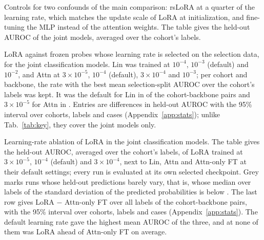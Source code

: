 \begin{table}[H]
\centering
\caption{Controls for two confounds of the main comparison: rsLoRA at a quarter of the learning rate, which matches the update scale of LoRA at initialization, and fine-tuning the MLP instead of the attention weights. The table gives the held-out AUROC of the joint models, averaged over the cohort's labels.}
\label{tab:controls}
\end{table}

\begin{table}[H]
\centering
\caption{LoRA against frozen probes whose learning rate is selected on the selection data, for the joint classification models. Lin was trained at $10^{-4}$, $10^{-3}$ (default) and $10^{-2}$, and Attn at $3\times10^{-5}$, $10^{-4}$ (default), $3\times10^{-4}$ and $10^{-3}$; per cohort and backbone, the rate with the best mean selection-split AUROC over the cohort's labels was kept. It was the default for Lin in \numProbelrLinKeptN{} of the \numProbelrPairsN{} cohort-backbone pairs and $3\times10^{-5}$ for Attn in \numProbelrAttnLowN{}. Entries are differences in held-out AUROC with the 95\% interval over cohorts, labels and cases (Appendix~\ref{app:stats}); unlike Tab.~\ref{tab:key}, they cover the joint models only.}
\label{tab:probelr}
\end{table}

\begin{table}[H]
\centering
\caption{Learning-rate ablation of LoRA in the joint classification models. The table gives the held-out AUROC, averaged over the cohort's labels, of LoRA trained at $3\times10^{-5}$, $10^{-4}$ (default) and $3\times10^{-4}$, next to Lin, Attn and Attn-only FT at their default settings; every run is evaluated at its own selected checkpoint. Grey marks runs whose held-out predictions barely vary, that is, whose median over labels of the standard deviation of the predicted probabilities is below \numSpreadMinValue{}. The last row gives LoRA $-$ Attn-only FT over all labels of the \numLoralrPairsN{} cohort-backbone pairs, with the 95\% interval over cohorts, labels and cases (Appendix~\ref{app:stats}). The default learning rate gave the highest mean AUROC of the three, and at none of them was LoRA ahead of Attn-only FT on average.}
\label{tab:loralr}
\end{table}

